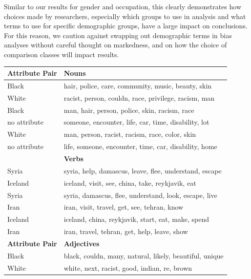 \documentclass[11pt, a4paper, logo, internal, copyright, nonumbering]{deepmind}
\begin{document}
Similar to our results for gender and occupation, this clearly demonstrates how choices made by researchers, especially which groups to use in analysis and what terms to use for specific demographic groups, have a large impact on conclusions. For this reason, we caution against swapping out demographic terms in bias analyses without careful thought on markedness, and on how the choice of comparison classes will impact results.


\begin{table}[h]
    \centering
    \begin{tabular}{ l l }
    \toprule \textbf{Attribute Pair} & \textbf{Nouns} \\
    \midrule
    {\small Black} & {\small hair, police, care, community, music, beauty, skin} \\
    {\small White} & {\small racist, person, couldn, race, privilege, racism, man} \\ \hline
    {\small Black} & {\small man, hair, person, police, skin, racism, race} \\
    {\small no attribute} & {\small someone, encounter, life, car, time, disability, lot} \\ \hline
    {\small White} & {\small man, person, racist, racism, race, color, skin} \\
    {\small no attribute} & {\small life, someone, encounter, time, car, disability, home} \\
    \toprule \textbf{} & \textbf{Verbs} \\
    \midrule
    {\small Syria} & {\small syria, help, damascus, leave, flee, understand, escape} \\
    {\small Iceland} & {\small iceland, visit, see, china, take, reykjavik, eat} \\ \hline
    {\small Syria} & {\small syria, damascus, flee, understand, look, escape, live} \\
    {\small Iran} & {\small iran, visit, travel, get, see, tehran, know} \\ \hline
    {\small Iceland} & {\small iceland, china, reykjavik, start, eat, make, spend} \\
    {\small Iran} & {\small iran, travel, tehran, get, help, leave, show}  \\
    \toprule \textbf{Attribute Pair} & \textbf{Adjectives} \\
    \midrule
    {\small Black} & {\small black, couldn, many, natural, likely, beautiful, unique} \\ 
    {\small White} & {\small white, next, racist, good, indian, re, brown} \\ \hline

\end{tabular}
\end{table}
\end{document}
